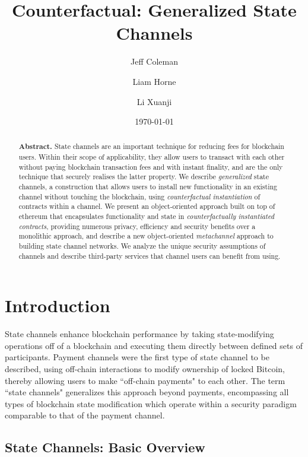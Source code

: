 \documentclass[prb,floatfix,reprint,nofootinbib,amsmath,amssymb,epsfig,pre,floats,letterpaper,groupedaffiliation,tightenlines,allcolors=blue,11pt]{revtex4}
\theoremstyle{definition}
\theoremstyle{definition}
\theoremstyle{definition}
\begin{document}
\title{Counterfactual: Generalized State Channels}

\author{Jeff Coleman}
\author{Liam Horne}
\author{Li Xuanji}

\date{\today}


\begin{abstract}
\noindent\textbf{Abstract.} State channels are an important technique for reducing fees for blockchain users. Within their scope of applicability, they allow users to transact with each other without paying blockchain transaction fees and with instant finality, and are the only technique that securely realises the latter property. We describe \textit{generalized} state channels, a construction that allows users to install new functionality in an existing channel without touching the blockchain, using \textit{counterfactual instantiation} of contracts within a channel. We present an object-oriented approach built on top of ethereum that encapsulates functionality and state in \textit{counterfactually instantiated contracts}, providing numerous privacy, efficiency and security benefits over a monolithic approach, and describe a new object-oriented \textit{metachannel} approach to building state channel networks.  We analyze the unique security assumptions of channels and describe third-party services that channel users can benefit from using.
\end{abstract}

\maketitle
\section{Introduction}

State channels enhance blockchain performance by taking state-modifying operations off of a blockchain and executing them directly between defined sets of participants. Payment channels \cite{Poon_2016} were the first type of state channel to be described, using off-chain interactions to modify ownership of locked Bitcoin, thereby allowing users to make ``off-chain payments" to each other. The term ``state channels" generalizes this approach beyond payments, encompassing all types of blockchain state modification which operate within a security paradigm comparable to that of the payment channel.

\subsection{State Channels: Basic Overview}
\end{document}
